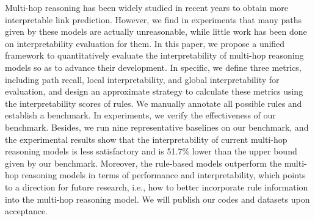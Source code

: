 Multi-hop reasoning has been widely studied in recent years to obtain more interpretable link prediction. However, we find in experiments that many paths given by these models are actually unreasonable, while little work has been done on interpretability evaluation for them. In this paper, we propose a unified framework to quantitatively evaluate the interpretability of multi-hop reasoning models so as to advance their development. In specific, we define three metrics, including path recall, local interpretability, and global interpretability for evaluation, and design an approximate strategy to calculate these metrics using the interpretability scores of rules. We manually annotate all possible rules and establish a benchmark. In experiments, we verify the effectiveness of our benchmark. Besides, we run nine representative baselines on our benchmark, and the experimental results show that the interpretability of current multi-hop reasoning models is less satisfactory and is 51.7\% lower than the upper bound given by our benchmark. Moreover, the rule-based models outperform the multi-hop reasoning models in terms of performance and interpretability, which points to a direction for future research, i.e., how to better incorporate rule information into the multi-hop reasoning model. We will publish our codes and datasets upon acceptance.
